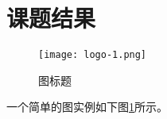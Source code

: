 \section{课题结果}
\setcounter{figure}{0}  %
\setcounter{table}{0}

\begin{figure}[H]
\centering
\texttt{[image: logo-1.png]}
\caption{图标题}
\label{2-1}
\end{figure}
一个简单的图实例如下图\ref{2-1}所示。



\clearpage 